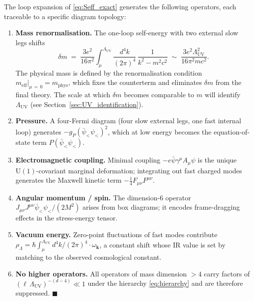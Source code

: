 \documentclass[11pt,a4paper]{article}
\theoremstyle{definition}
\theoremstyle{remark}
\begin{document}
		The loop expansion of \eqref{eq:Seff_exact} generates the following operators,
		each traceable to a specific diagram topology:
		\begin{enumerate}
			\item \textbf{Mass renormalisation.}
			The one-loop self-energy with two external slow legs shifts
			\begin{equation}
				\delta m \;=\; \frac{3e^2}{16\pi^2}\int_\mu^{\Lambda_{\mathrm{UV}}}
				\frac{d^4k}{(2\pi)^4}\,\frac{1}{k^2 - m^2c^2}
				\;\sim\; \frac{3e^2\Lambda_{\mathrm{UV}}^2}{16\pi^2 mc^2}.
				\label{eq:deltam}
			\end{equation}
			The physical mass is defined by the renormalisation condition
			$m_{\mathrm{eff}}|_{\mu\,=\,0} = m_{\mathrm{phys}}$, which fixes
			the counterterm and eliminates $\delta m$ from the final theory.
			The scale at which $\delta m$ becomes comparable to $m$ will identify
			$\Lambda_{\mathrm{UV}}$ (see Section~\ref{sec:UV_identification}).
			
			\item \textbf{Pressure.}
			A four-Fermi diagram (four slow external legs, one fast internal loop)
			generates $-g_P(\bar{\psi}_{<}\psi_{<})^2$, which at low energy becomes
			the equation-of-state term $P(\bar{\psi}_{<}\psi_{<})$.
			
			\item \textbf{Electromagnetic coupling.}
			Minimal coupling $-e\bar{\psi}\gamma^\mu A_\mu\psi$ is the unique
			$\mathrm{U}(1)$-covariant marginal deformation; integrating out fast
			charged modes generates the Maxwell kinetic term
			$-\tfrac{1}{4}F_{\mu\nu}F^{\mu\nu}$.
			
			\item \textbf{Angular momentum / spin.}
			The dimension-6 operator
			$J_{\mu\nu}J^{\mu\nu}\bar{\psi}_{<}\psi_{<}/(2M^2)$ arises from
			box diagrams; it encodes frame-dragging effects in the stress-energy
			tensor.
			
			\item \textbf{Vacuum energy.}
			Zero-point fluctuations of fast modes contribute
			$\rho_\Lambda = \hbar\int_\mu^{\Lambda_{\mathrm{UV}}}
			d^4k/(2\pi)^4\cdot\omega_{\mathbf{k}}$, a constant shift whose
			IR value is set by matching to the observed cosmological constant.
			
			\item \textbf{No higher operators.}
			All operators of mass dimension $>4$ carry factors of
			$(\ell\,\Lambda_{\mathrm{UV}})^{-(d-4)} \ll 1$ under the hierarchy
			\eqref{eq:hierarchy} and are therefore suppressed. \hfill$\blacksquare$
		\end{enumerate}
	
\end{document}
